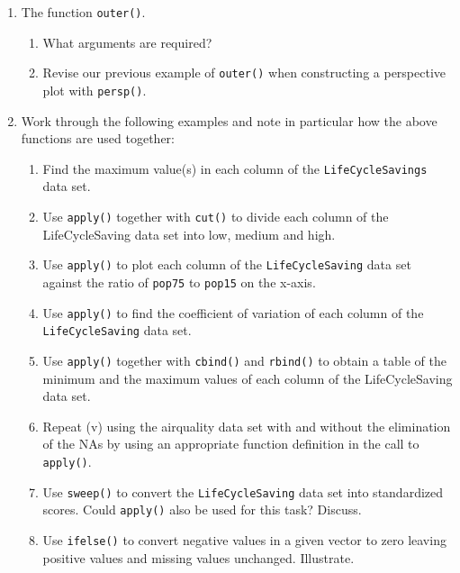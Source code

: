 \documentclass[
]{book}
\begin{document}
\begin{enumerate}
\def\labelenumi{(\alph{enumi})}
\setcounter{enumi}{4}
\item
  The function \texttt{outer()}.

  \begin{enumerate}
  \def\labelenumii{(\roman{enumii})}
  \item
    What arguments are required?
  \item
    Revise our previous example of \texttt{outer()} when constructing a perspective plot with \texttt{persp()}.
  \end{enumerate}
\item
  Work through the following examples and note in particular how the above functions are used together:

  \begin{enumerate}
  \def\labelenumii{(\roman{enumii})}
  \item
    Find the maximum value(s) in each column of the \texttt{LifeCycleSavings} data set.
  \item
    Use \texttt{apply()} together with \texttt{cut()} to divide each column of the LifeCycleSaving data set into low, medium and high.
  \item
    Use \texttt{apply()} to plot each column of the \texttt{LifeCycleSaving} data set against the ratio of \texttt{pop75} to \texttt{pop15} on the x-axis.
  \item
    Use \texttt{apply()} to find the coefficient of variation of each column of the \texttt{LifeCycleSaving} data set.
  \item
    Use \texttt{apply()} together with \texttt{cbind()} and \texttt{rbind()} to obtain a table of the minimum and the maximum values of each column of the LifeCycleSaving data set.
  \item
    Repeat (v) using the airquality data set with and without the elimination of the NAs by using an appropriate function definition in the call to \texttt{apply()}.
  \item
    Use \texttt{sweep()} to convert the \texttt{LifeCycleSaving} data set into standardized scores. Could \texttt{apply()} also be used for this task? Discuss.
  \item
    Use \texttt{ifelse()} to convert negative values in a given vector to zero leaving positive values and missing values unchanged. Illustrate.
  \end{enumerate}
\end{enumerate}
\end{document}
